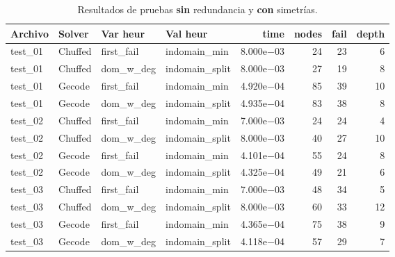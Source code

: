 \begin{compactfloats}
\begin{table}[H]
  \centering
  \small
  \setlength{\tabcolsep}{10.8pt}
  \caption{Resultados de pruebas \textbf{sin} redundancia y \textbf{con} simetrías.}
  \label{tab:pruebas-rectangulo-nosym-red}
  \begin{tabular}{l l l l r r r r}
    \toprule
    \textbf{Archivo} & \textbf{Solver} & \textbf{Var heur} & \textbf{Val heur} & \textbf{time} & \textbf{nodes} & \textbf{fail} & \textbf{depth} \\
    \midrule
    test\_01 & Chuffed & first\_fail  & indomain\_min   & 8.000e$-$03 & 24 & 23 & 6 \\
    test\_01 & Chuffed & dom\_w\_deg  & indomain\_split & 8.000e$-$03 & 27 & 19 & 8 \\
    test\_01 & Gecode  & first\_fail  & indomain\_min   & 4.920e$-$04 & 85 & 39 & 10 \\
    test\_01 & Gecode  & dom\_w\_deg  & indomain\_split & 4.935e$-$04 & 83 & 38 & 8 \\
    \midrule
    test\_02 & Chuffed & first\_fail  & indomain\_min   & 7.000e$-$03 & 24 & 24 & 4 \\
    test\_02 & Chuffed & dom\_w\_deg  & indomain\_split & 8.000e$-$03 & 40 & 27 & 10 \\
    test\_02 & Gecode  & first\_fail  & indomain\_min   & 4.101e$-$04 & 55 & 24 & 8 \\
    test\_02 & Gecode  & dom\_w\_deg  & indomain\_split & 4.325e$-$04 & 49 & 21 & 6 \\
    \midrule
    test\_03 & Chuffed & first\_fail  & indomain\_min   & 7.000e$-$03 & 48 & 34 & 5 \\
    test\_03 & Chuffed & dom\_w\_deg  & indomain\_split & 8.000e$-$03 & 60 & 33 & 12 \\
    test\_03 & Gecode  & first\_fail  & indomain\_min   & 4.365e$-$04 & 75 & 38 & 9 \\
    test\_03 & Gecode  & dom\_w\_deg  & indomain\_split & 4.118e$-$04 & 57 & 29 & 7 \\
    \bottomrule
  \end{tabular}
\end{table}


\end{compactfloats}
